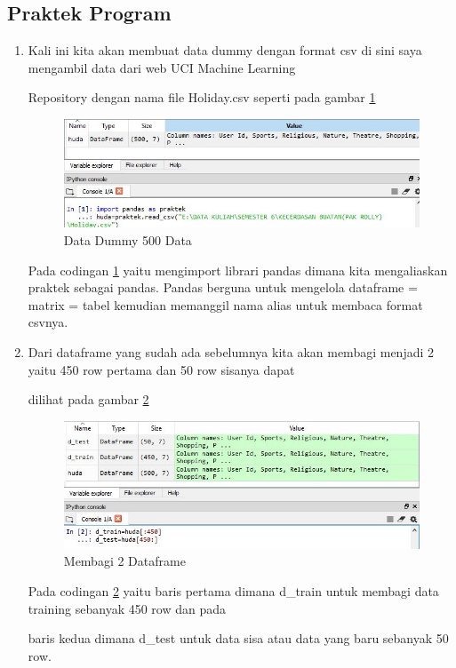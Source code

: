 \subsection{Praktek Program}
\begin{enumerate}
\item Kali ini kita akan membuat data dummy dengan format csv di sini saya mengambil data dari web UCI Machine Learning 
\par Repository dengan nama file Holiday.csv seperti pada gambar \ref{c4_6}
\begin{figure}[ht]
	\centerline{\includegraphics[width=1\textwidth]{figures/huda/chapter4/6.JPG}}
	\caption{Data Dummy 500 Data}
	\label{c4_6}
\end{figure}
\subitem Pada codingan \ref{c4_6} yaitu mengimport librari pandas dimana kita mengaliaskan praktek sebagai pandas. Pandas berguna untuk mengelola  dataframe = matrix = tabel kemudian memanggil nama alias untuk membaca format csvnya.
\item Dari dataframe yang sudah ada sebelumnya kita akan membagi menjadi 2 yaitu 450 row pertama dan 50 row sisanya dapat
\par dilihat pada gambar \ref{c4_7}
\begin{figure}[ht]
	\centerline{\includegraphics[width=1\textwidth]{figures/huda/chapter4/7.JPG}}
	\caption{Membagi 2 Dataframe}
	\label{c4_7}
\end{figure}
\subitem Pada codingan \ref{c4_7} yaitu baris pertama dimana d\_train untuk membagi data training sebanyak 450 row dan pada 
\par baris kedua dimana d\_test untuk data sisa atau data yang baru sebanyak 50 row.

\end{enumerate}
